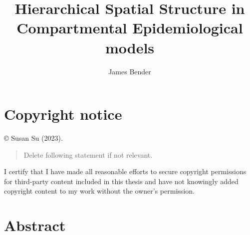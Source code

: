 \documentclass[
  letterpaper,
  DIV=11,
  numbers=noendperiod]{scrreprt}
\title{Hierarchical Spatial Structure in Compartmental Epidemiological
models}
\author{James Bender}
\date{}
\renewcommand*\contentsname{Table of contents}
\newcommand\contentsname{Table of contents}
\begin{document}
\maketitle
\renewcommand{\Return}{\State \textbf{return}~}
\newcommand{\Print}{\State \textbf{print}~}
\newcommand{\Break}{\State \textbf{break}}
\newcommand{\Continue}{\State \textbf{continue}}
\newcommand{\True}{\textbf{true}}
\newcommand{\False}{\textbf{false}}
\renewcommand{\And}{\textbf{and}~}
\newcommand{\Or}{\textbf{or}~}
\renewcommand{\Not}{\textbf{not}~}
\newcommand{\To}{\textbf{to}~}
\newcommand{\DownTo}{\textbf{downto}~}

\ifdefined\Shaded\renewenvironment{Shaded}{\begin{tcolorbox}[interior hidden, boxrule=0pt, breakable, sharp corners, enhanced, borderline west={3pt}{0pt}{shadecolor}, frame hidden]}{\end{tcolorbox}}\fi


\renewcommand*\contentsname{Sections}
{
\hypersetup{linkcolor=}
\setcounter{tocdepth}{1}
\tableofcontents
}

\hypertarget{copyright-notice}{%
\chapter*{Copyright notice}\label{copyright-notice}}


© Susan Su (2023).

\begin{quote}
Delete following statement if not relevant.
\end{quote}

I certify that I have made all reasonable efforts to secure copyright
permissions for third-party content included in this thesis and have not
knowingly added copyright content to my work without the owner's
permission.


\hypertarget{abstract}{%
\chapter*{Abstract}\label{abstract}}

\end{document}
